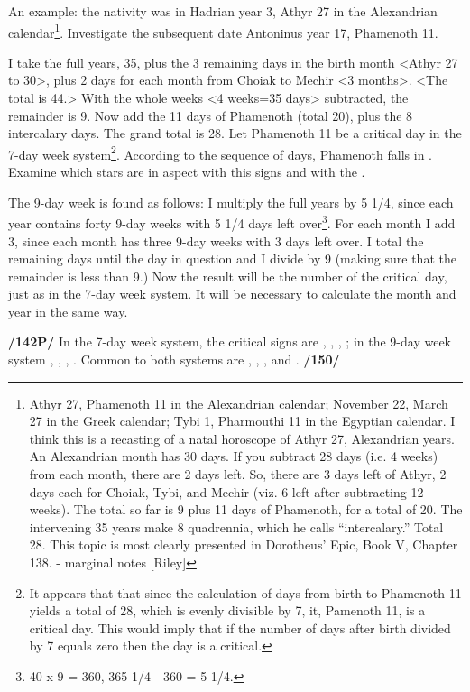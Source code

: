 An example: the nativity was in Hadrian year 3, Athyr 27 in the Alexandrian calendar\footnote{Athyr 27, Phamenoth 11 in the Alexandrian calendar; November 22, March 27 in the Greek calendar; Tybi 1, Pharmouthi 11 in the Egyptian calendar.
I think this is a recasting of a natal horoscope of Athyr 27, Alexandrian years. An Alexandrian month has 30 days. If you subtract 28 days (i.e. 4 weeks) from each month, there are 2
days left. So, there are 3 days left of Athyr, 2 days each for Choiak, Tybi, and Mechir (viz. 6 left after subtracting 12 weeks). The total so far is 9 plus 11 days of Phamenoth, for a total of 20. The intervening 35 years make 8 quadrennia, which he calls “intercalary.” Total 28. This topic is most clearly presented in Dorotheus’ Epic, Book V, Chapter 138. - marginal notes [Riley]}. Investigate the subsequent date Antoninus year 17, Phamenoth 11. 

I take the full years, 35, plus the 3 remaining days in the birth month <Athyr 27 to 30>, plus 2 days for each month from Choiak to Mechir <3 months>. <The total is 44.> With the whole weeks <4 weeks=35 days> subtracted, the remainder is 9. Now add the 11 days of Phamenoth (total 20), plus the 8 intercalary days. The grand total is 28. Let Phamenoth 11 be a critical day in the 7-day week system\footnote{It appears that that since the calculation of days from birth to Phamenoth 11 yields a total of 28, which is evenly divisible by 7, it, Pamenoth 11, is a critical day. This would imply that if the number of days after birth divided by 7 equals zero then the day is a critical.}. According to the sequence of days, Phamenoth falls in \Scorpio. Examine which stars are in aspect with this signs and with the \Moon.

The 9-day week is found as follows: I multiply the full years by 5 1/4, since each year contains forty 9-day weeks with 5 1/4 days left over\footnote{40 x 9 = 360, 365 1/4 - 360 = 5 1/4.}. For each month I add 3, since each month has three 9-day weeks with 3 days left over. I total the remaining days until the day in question and I divide by 9 (making sure that the remainder is less than 9.) Now the result will be the number of the critical day, just as in the 7-day week system. It will be necessary to calculate the month and year in the same way.

\textbf{/142P/} In the 7-day week system, the critical signs are \Aries, \Libra, \Cancer, \Capricorn; in the 9-day
week system \Taurus, \Leo, \Scorpio, \Aquarius. Common to both systems are \Gemini, \Sagittarius, \Virgo, and \Pisces. \textbf{/150/}

\newpage
